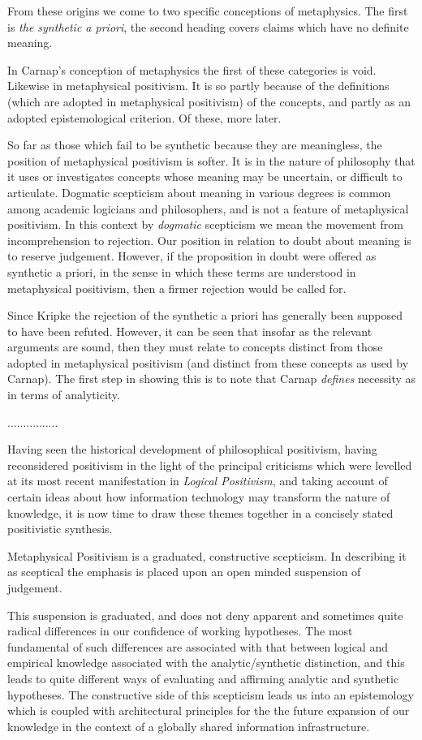 From these origins we come to two specific conceptions of metaphysics.
The first is \emph{the synthetic a priori}, the second heading covers
claims which have no definite meaning.

In Carnap's conception of metaphysics the first of these categories is
void.
Likewise in metaphysical positivism.
It is so partly because of the definitions (which are adopted in
metaphysical positivism) of the concepts, and partly as an adopted
epistemological criterion.
Of these, more later.

So far as those which fail to be synthetic because they are
meaningless, the position of metaphysical positivism is softer.
It is in the nature of philosophy that it uses or investigates
concepts whose meaning may be uncertain, or difficult to articulate.
Dogmatic scepticism about meaning in various degrees is common among
academic logicians and philosophers, and is not a feature of
metaphysical positivism.
In this context by \emph{dogmatic} scepticism we mean the movement
from incomprehension to rejection.
Our position in relation to doubt about meaning is to reserve
judgement.
However, if the proposition in doubt were offered as synthetic a
  priori, in the sense in which these terms are understood in
  metaphysical positivism, then a firmer rejection would be called for. 

Since Kripke the rejection of the synthetic a priori has generally
been supposed to have been refuted.
However, it can be seen that insofar as the relevant arguments are
sound, then they must relate to concepts distinct from those adopted
in metaphysical positivism (and distinct from these concepts as used
by Carnap).
The first step in showing this is to note that Carnap \emph{defines}
necessity as in terms of analyticity.

................


Having seen the historical development of philosophical positivism,
having reconsidered positivism in the light of the principal
criticisms which were levelled at its most recent manifestation in
\emph{Logical Positivism}, and taking account of certain ideas
about how information technology may transform the nature of
knowledge, it is now time to draw these themes together in a concisely
stated positivistic synthesis.

Metaphysical Positivism is a graduated, constructive scepticism.
In describing it as sceptical the emphasis is placed upon an open
minded suspension of judgement.

This suspension is graduated, and does not deny apparent and
sometimes quite radical differences in our confidence of working
hypotheses.
The most fundamental of such differences are associated with that
between logical and empirical knowledge associated with the
analytic/synthetic distinction, and this leads to quite different ways
of evaluating and affirming analytic and synthetic hypotheses.
The constructive side of this scepticism leads us into an epistemology
which is coupled with architectural principles for the the future
expansion of our knowledge in the context of a globally shared
information infrastructure.

